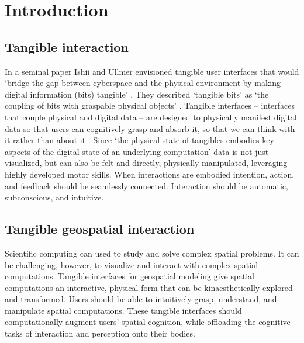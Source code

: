 \chapter{Introduction}
\label{chap-one}

\section{Tangible interaction}

In a seminal paper Ishii and Ullmer 
envisioned tangible user interfaces that would 
`bridge the gap between cyberspace and the physical environment 
by making digital information (bits) tangible' \cite{Ishii1997}.
They described `tangible bits' as 
`the coupling of bits with graspable physical objects' \cite{Ishii1997}. 
Tangible interfaces 
-- interfaces that couple physical and digital data \cite{Dourish2001} -- 
are designed to physically manifest digital data 
so that users can cognitively grasp and absorb it,
so that we can think with it rather than about it \cite{Kirsh2013}. 
Since 
`the physical state of tangibles 
embodies key aspects of the digital state 
of an underlying computation' \citep{Ishii2008}
data is not just visualized, 
but can also be felt and directly, physically manipulated, 
leveraging highly developed motor skills. 
When interactions are embodied 
intention, action, and feedback 
should be seamlessly connected.
Interaction should be automatic, subconscious, and intuitive.

\section{Tangible geospatial interaction}

Scientific computing can used to study and 
solve complex spatial problems. 
It can be challenging, however, 
to visualize and interact with complex spatial computations.
Tangible interfaces for geospatial modeling 
give spatial computations 
an interactive, physical form
that can be kinaesthetically 
explored and transformed.
Users should be able to 
intuitively grasp, understand, and manipulate 
spatial computations.
These tangible interfaces
should computationally augment users' spatial cognition, 
while offloading the cognitive tasks of 
interaction and perception onto their bodies. 

